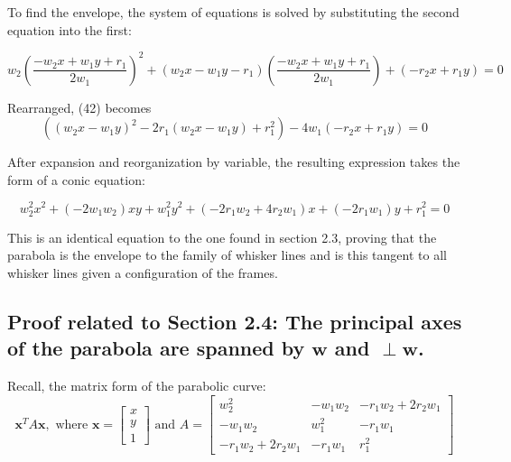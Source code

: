 \documentclass[11pt]{article}
\newcommand{\bs}[1]{\boldsymbol{#1}} %
\begin{document}
        To find the envelope, the system of equations is solved by substituting the second equation into the first:

        \begin{equation}
          w_2\left(\frac{-w_2x + w_1y + r_1}{2w_1}\right)^2 + (w_2x - w_1y - r_1)\left(\frac{-w_2x + w_1y + r_1}{2w_1}\right) + (-r_2x + r_1y) = 0
          \label{eq:Eq42}
        \end{equation}
    
        Rearranged, (42) becomes 
        \begin{equation}
          \left((w_2x - w_1y)^2 - 2r_1(w_2x - w_1y) + r_1^2\right) - 4w_1(-r_2x + r_1y) = 0
          \label{eq:Eq43}
        \end{equation}
    
        After expansion and reorganization by variable, the resulting expression takes the form of a conic equation: 

        \begin{equation}
            w_2^2x^2 + (-2w_1w_2)xy + w_1^2y^2 + (-2r_1w_2 + 4r_2w_1)x + (-2r_1w_1)y + r_1^2 = 0
            \label{eq:Eq44}
        \end{equation}
    
        This is an identical equation to the one found in section 2.3, proving that the parabola is the envelope to the family of whisker lines and is this tangent to all whisker lines given a configuration of the frames.  

    \subsection{Proof related to Section 2.4: The principal axes of the parabola are spanned by $\boldsymbol{w}$ and $\perp\bs{w}$.}
    
        Recall, the matrix form of the parabolic curve: \\
        \setcounter{equation}{28}
        \begin{equation}
            \bs{x}^TA\bs{x}, \text{ where } \bs{x} = \begin{bmatrix} x \\ y \\ 1 \end{bmatrix} \text{ and } 
            A = \begin{bmatrix} w_2^2               & -w_1w_2   & -r_1w_2 + 2r_2w_1 \\
                                -w_1w_2             & w_1^2     & -r_1w_1 \\
                                -r_1w_2 + 2r_2w_1   & -r_1w_1   & r_1^2\end{bmatrix}
            \label{eq:Eq29}
        \end{equation}
\end{document}
